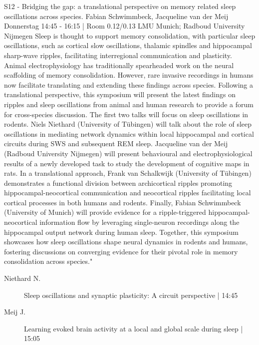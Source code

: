 
            \begin{symposium}
            {S12 - Bridging the gap: a translational perspective on memory related sleep oscillations across species.}
            {Fabian Schwimmbeck, Jacqueline van der Meij}
            {Donnerstag 14:45 - 16:15 | Room 0.12/0.13}
            {LMU Munich; Radboud University Nijmegen}
            Sleep is thought to support memory consolidation, with particular sleep oscillations, such as cortical slow oscillations, thalamic spindles and hippocampal sharp-wave ripples, facilitating interregional communication and plasticity. Animal electrophysiology has traditionally spearheaded work on the neural scaffolding of memory consolidation. However, rare invasive recordings in humans now facilitate translating and extending these findings across species.
Following a translational perspective, this symposium will present the latest findings on ripples and sleep oscillations from animal and human research to provide a forum for cross-species discussion.
The first two talks will focus on sleep oscillations in rodents. Niels Niethard (University of Tübingen) will talk about the role of sleep oscillations in mediating network dynamics within local hippocampal and cortical circuits during SWS and subsequent REM sleep.
Jacqueline van der Meij (Radboud University Nijmegen) will present behavioural and electrophysiological results of a newly developed task to study the development of cognitive maps in rats.
In a translational approach, Frank van Schalkwijk (University of Tübingen) demonstrates a functional division between archicortical ripples promoting hippocampal-neocortical communication and neocortical ripples facilitating local cortical processes in both humans and rodents.
Finally, Fabian Schwimmbeck (University of Munich) will provide evidence for a ripple-triggered hippocampal-neocortical information flow by leveraging single-neuron recordings along the hippocampal output network during human sleep.
Together, this symposium showcases how sleep oscillations shape neural dynamics in rodents and humans, fostering discussions on converging evidence for their pivotal role in memory consolidation across species."
            \begin{description}    
            
                \item [ Niethard N.] Sleep oscillations and synaptic plasticity: A circuit perspective \textcolor{mygray}{ | 14:45}    
                
                \item [ Meij J.] Learning evoked brain activity at a local and global scale during sleep \textcolor{mygray}{ | 15:05}    
                

\end{description}
\end{symposium}
